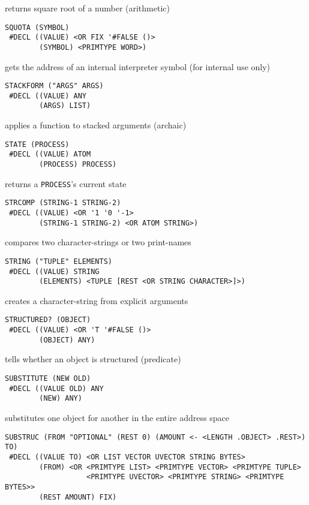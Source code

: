 \documentclass[a4paper,]{article}
\begin{document}
returns square root of a number (arithmetic)

\begin{verbatim}
SQUOTA (SYMBOL)
 #DECL ((VALUE) <OR FIX '#FALSE ()>
        (SYMBOL) <PRIMTYPE WORD>)
\end{verbatim}

 gets the address of an internal interpreter symbol (for internal use only)

\begin{verbatim}
STACKFORM ("ARGS" ARGS)
 #DECL ((VALUE) ANY
        (ARGS) LIST)
\end{verbatim}

applies a function to stacked arguments (archaic)

\begin{verbatim}
STATE (PROCESS)
 #DECL ((VALUE) ATOM
        (PROCESS) PROCESS)
\end{verbatim}

returns a \texttt{PROCESS}'s current state

\begin{verbatim}
STRCOMP (STRING-1 STRING-2)
 #DECL ((VALUE) <OR '1 '0 '-1>
        (STRING-1 STRING-2) <OR ATOM STRING>)
\end{verbatim}

compares two character-strings or two print-names

\begin{verbatim}
STRING ("TUPLE" ELEMENTS)
 #DECL ((VALUE) STRING
        (ELEMENTS) <TUPLE [REST <OR STRING CHARACTER>]>)
\end{verbatim}

creates a character-string from explicit arguments

\begin{verbatim}
STRUCTURED? (OBJECT)
 #DECL ((VALUE) <OR 'T '#FALSE ()>
        (OBJECT) ANY)
\end{verbatim}

tells whether an object is structured (predicate)

\begin{verbatim}
SUBSTITUTE (NEW OLD)
 #DECL ((VALUE OLD) ANY
        (NEW) ANY)
\end{verbatim}

substitutes one object for another in the entire address space

\begin{verbatim}
SUBSTRUC (FROM "OPTIONAL" (REST 0) (AMOUNT <- <LENGTH .OBJECT> .REST>) TO)
 #DECL ((VALUE TO) <OR LIST VECTOR UVECTOR STRING BYTES>
        (FROM) <OR <PRIMTYPE LIST> <PRIMTYPE VECTOR> <PRIMTYPE TUPLE>
                   <PRIMTYPE UVECTOR> <PRIMTYPE STRING> <PRIMTYPE BYTES>>
        (REST AMOUNT) FIX)
\end{verbatim}
\end{document}
